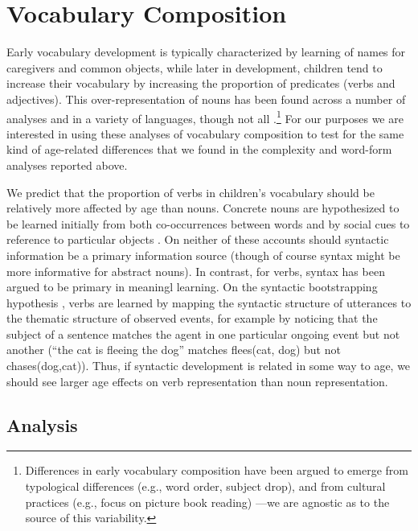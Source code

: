 \documentclass[10pt,letterpaper]{article}
\begin{document}
\section{Vocabulary Composition}

Early vocabulary development is typically characterized by learning of names for caregivers and common objects, while later in development, children tend to increase their vocabulary by increasing the proportion of predicates (verbs and adjectives). This over-representation of nouns has been found across a number of analyses and in a variety of languages, though not all \cite{caselli1995}.\footnote{Differences in early vocabulary composition have been argued to emerge from typological differences (e.g., word order, subject drop), and from cultural practices (e.g., focus on picture book reading) \cite{tardif1999, gopnik1996, choi1995}---we are agnostic as to the source of this variability.} For our purposes we are interested in using these analyses of vocabulary composition to test for the same kind of age-related differences that we found in the complexity and word-form analyses reported above. 

We predict that the proportion of verbs in children's vocabulary should be relatively more affected by age than nouns. Concrete nouns are hypothesized to be learned initially from both co-occurrences between words \cite{yu2007b} and by social cues to reference to particular objects \cite{bloom2002}. On neither of these accounts should syntactic information be a primary information source (though of course syntax might be more informative for abstract nouns). In contrast, for verbs, syntax has been argued to be primary in meaningl learning. On the syntactic bootstrapping hypothesis \cite{gleitman1990,fisher1993}, verbs are learned by  mapping the syntactic structure of utterances to the thematic structure of observed events, for example by noticing that the subject of a sentence matches the agent in one particular ongoing event but not another (``the cat is fleeing the dog'' matches  {\sc flees(cat, dog)} but not {\sc chases(dog,cat)}). Thus, if syntactic development is related in some way to age, we should see larger age effects on verb representation than noun representation. 

\subsection{Analysis}
\end{document}

